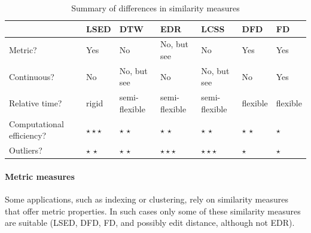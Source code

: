\documentclass{interact}
\begin{document}
\begin{table}[htb]
    \caption{Summary of differences in similarity measures}\label{tab:key}
\renewcommand{\arraystretch}{2}
    \begin{tabular}{>{\raggedright\arraybackslash}p{2.8cm}|>{\raggedright\arraybackslash}p{1.25cm}>{\raggedright\arraybackslash}p{1.25cm}>{\raggedright\arraybackslash}p{1.25cm}>{\raggedright\arraybackslash}p{1.25cm}>{\raggedright\arraybackslash}p{1.25cm}p{1.25cm}}
~                                        & LSED     & DTW         & EDR         & LCSS        & DFD      & FD      \\ \hline
    Metric?                                  & Yes      & \cellcolor{gray!30}  No          & \cellcolor{gray!15} No, but see \cite{NgC04}& \cellcolor{gray!30} No          & Yes      & Yes     \\
    Continuous?                              & \cellcolor{gray!30} No       & \cellcolor{gray!15} No, but see \cite{b-cfdts-07} & \cellcolor{gray!30} No          & \cellcolor{gray!15} No, but see \cite{bbw-09} & \cellcolor{gray!30} No       & Yes     \\
    Relative time?                           & \cellcolor{gray!30}  rigid       & \cellcolor{gray!15} semi-flexible         & \cellcolor{gray!15} semi-flexible         & \cellcolor{gray!15} semi-flexible        & flexible      & flexible     \\
    Computational efficiency?                & $\star\star\star$  & \cellcolor{gray!15} $\star\,\star$    & \cellcolor{gray!15} $\star\,\star$    & \cellcolor{gray!15}$\star\,\star$    & \cellcolor{gray!15}$\star\,\star$ & \cellcolor{gray!30}$\star$ \\
    Outliers?                                & \cellcolor{gray!15}$\star\,\star$ & \cellcolor{gray!15}$\star\,\star$    & $\star\star\star$        & $\star\star\star$        & \cellcolor{gray!30} $\star$     & \cellcolor{gray!30} $\star$    \\
    \end{tabular}
\end{table}
	

\paragraph*{Metric measures}  Some applications, such as indexing or clustering, rely on similarity measures that offer metric properties. In such cases only some of these similarity measures are suitable (LSED, DFD, FD, and possibly edit distance, although not EDR).
 	
\end{document}
